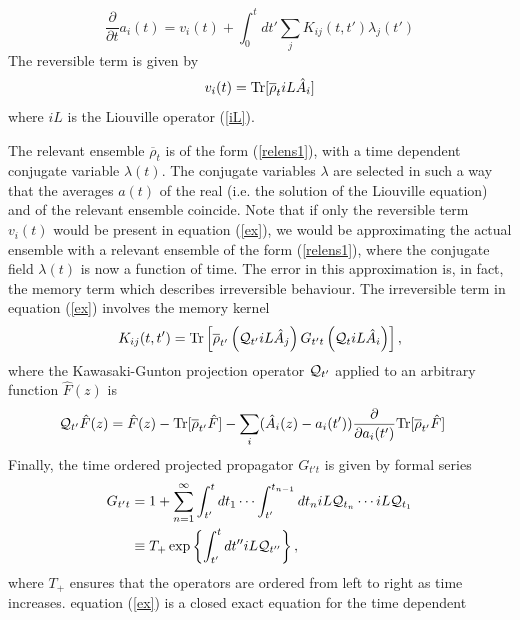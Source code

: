 \documentclass[b5paper,openright,10pt]{book}
\begin{document}
\begin{equation}
\frac{\partial }{\partial t} a_i(t)
= v_i(t) + \int_0^t dt' \sum_j K_{ij}(t,t') \lambda_j(t')
\label{ex}
\end{equation}
The reversible term is given by
\begin{equation}
v_i(t) = {\rm Tr}[\overline{\rho}_t  iL \hat{A}_i]
\label{vit}
\end{equation}
where $iL$ is the Liouville operator (\ref{iL}).

The  relevant
ensemble $\overline{\rho}_t$  is of  the form (\ref{relens1}),  with a
time   dependent  conjugate   variable  $\lambda(t)$.   The  conjugate
variables  $\lambda$ are  selected in  such  a way  that the  averages
$a(t)$ of the  real (i.e. the  solution of the Liouville equation) and of the relevant ensemble  coincide.  Note that
if   only  the   reversible  term   $v_i(t)$  would   be  present   in
equation (\ref{ex}), we would be  approximating the actual ensemble 
with a relevant  ensemble of
the form (\ref{relens1}), where the conjugate field $\lambda(t)$ is now
a function of time.  The error  in this approximation is, in fact, the
memory term which describes  irreversible behaviour.  The irreversible
term in equation (\ref{ex}) involves the memory kernel
\begin{equation}
K_{ij}(t,t') =
{\rm Tr}\left[\overline{\rho}_{t'} 
\left({\cal Q}_{t'} iL\hat{A}_j\right) G_{t't}
\left({\cal Q}_{t } iL\hat{A}_i\right)\right],
\label{ker}
\end{equation}
where   the  Kawasaki-Gunton   projection  operator   ${\cal  Q}_{t'}$
\cite{Kawasaki1973a,  Grabert1982}  applied  to an  arbitrary  function
$\hat{F}(z)$ is
\begin{align}
  {\cal Q}_{t'}\hat{F}(z) &= \hat{F}(z)- {\rm Tr}[\overline{\rho}_{t'} \hat{F}]
-\sum_i(\hat{A}_i(z)-a_i(t'))\frac{\partial }{\partial a_i(t')}
{\rm Tr}[\overline{\rho}_{t'} \hat{F}]
\label{Q}
\end{align}
Finally, the time ordered projected propagator $G_{t't}$ is given by formal series
\begin{align}
  G_{t't}&=1
+\sum_{n=1}^\infty \int_{t'}^tdt_1\cdots\int_{t'}^{t_{n-1}}dt_n
 iL{\cal Q}_{t_n}\cdots  iL{\cal Q}_{t_1}
\nonumber\\
&\equiv T_+\exp\left\{\int_{t'}^t dt''  iL{\cal Q}_{t''}\right\},
\end{align}
where $T_+$ ensures that the operators are ordered from left to right as time increases.
equation   (\ref{ex}) is  a closed  exact equation  for the  time dependent
\end{document}
